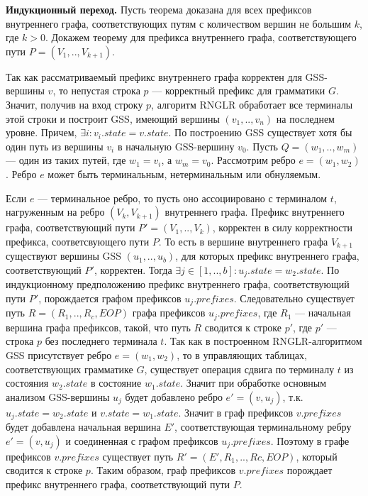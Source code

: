 \textbf{Индукционный переход.} Пусть теорема доказана для всех префиксов внутреннего графа, соответствующих путям с количеством вершин не большим $k$, где $k > 0$. Докажем теорему для префикса внутреннего графа, соответствующего пути $P = (V_{1},..,V_{k+1})$.

Так как рассматриваемый префикс внутреннего графа корректен для GSS-вершины $v$, то непустая строка $p$ --- корректный префикс для грамматики $G$. Значит, получив на вход строку $p$, алгоритм RNGLR обработает все терминалы этой строки и построит GSS, имеющий вершины $(v_{1},..,v_{n})$ на последнем уровне. Причем, $\exists i: v_{i}.state = v.state$. По построению GSS существует хотя бы один путь из вершины $v_{i}$ в начальную GSS-вершину $v_{0}$. Пусть $Q = (w_{1},..,w_{m})$ --- один из таких путей, где $w_{1} = v_{i}$, а $w_{m} = v_{0}$. Рассмотрим ребро $e = (w_{1}, w_{2})$. Ребро $e$ может быть терминальным, нетерминальным или обнуляемым.

Если $e$ --- терминальное ребро, то пусть оно ассоциировано с терминалом $t$, нагруженным на ребро $(V_{k}, V_{k+1})$ внутреннего графа. Префикс внутреннего графа, соответствующий пути $P' = (V_{1},..,V_{k})$, корректен в силу корректности префикса, соответсвующего пути $P$. То есть в вершине внутреннего графа $V_{k+1}$ существуют вершины GSS $(u_{1},..,u_{b})$, для которых префикс внутреннего графа, соответствующий $P'$, корректен. Тогда $\exists j \in [1,..,b]: u_{j}.state = w_{2}.state$. По индукционному предположению префикс внутреннего графа, соответствующий пути $P'$, порождается графом префиксов $u_{j}.prefixes$. Следовательно существует путь $R = (R_{1},..,R_{c}, EOP)$ графа префиксов $u_{j}.prefixes$, где $R_{1}$ --- начальная вершина графа префиксов, такой, что путь $R$ сводится к строке $p'$, где $p'$ --- строка $p$ без последнего терминала $t$. Так как в построенном RNGLR-алгоритмом GSS присутствует ребро $e = (w_{1}, w_{2})$, то в управляющих таблицах, соответствующих грамматике $G$, существует операция сдвига по терминалу $t$ из состояния $w_{2}.state$  в состояние $w_{1}.state$. Значит при обработке основным анализом GSS-вершины $u_{j}$ будет добавлено ребро $e' = (v, u_{j})$, т.к. $u_{j}.state = w_{2}.state$ и $v.state = w_{1}.state$. Значит в граф префиксов $v.prefixes$ будет добавлена начальная вершина $E'$, соответствующая терминальному ребру $e' = (v, u_{j})$ и соединенная с графом префиксов $u_{j}.prefixes$. Поэтому в графе префиксов $v.prefixes$ существует путь $R' = (E',R_{1},..,R{c},EOP)$, который сводится к строке $p$. Таким образом, граф префиксов $v.prefixes$ порождает префикс внутреннего графа, соответствующий пути $P$.

